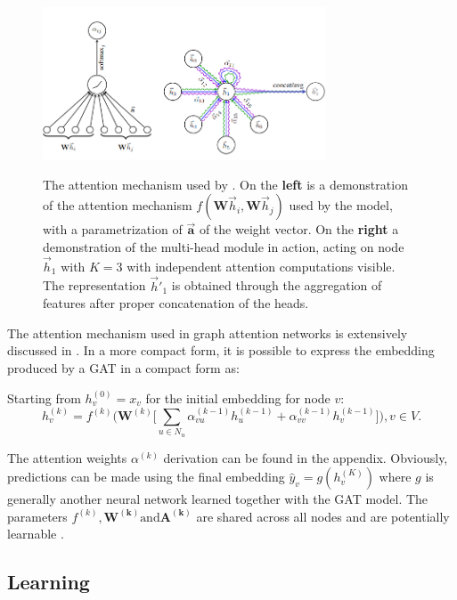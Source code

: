 \begin{figure}[H]
  \centering
  \includegraphics[width=0.75\textwidth]{Figures/chap_gnn/multiheadgat.png}
  \label{fig:multiheadGAN}
  \caption[Multi-head attention mechanism for representation
extraction]{The attention mechanism used by
\citet{velickovic2017graph}. On the \textbf{left} is a demonstration
of the attention mechanism $f(\bm{W}\vec{h}_i, \bm{W}\vec{h}_j) $ used
by the model, with a parametrization of $\bm{\vec{a}}$ of the weight
vector. On the \textbf{right} a demonstration of the multi-head module
in action, acting on node $\vec{h}_1$ with $K=3$ with independent
attention computations visible. The representation $\vec{h}'_1$ is
obtained through the aggregation of features after proper
concatenation of the heads. }
\end{figure}

The attention mechanism used in graph attention networks is extensively
discussed in . In a more compact form, it is possible
to express the embedding produced by a GAT in a compact form as:

Starting from $h_v^{(0)} = x_v$ for the initial embedding for node $v$:
\begin{equation}
h_v^{(k)} = f^{(k)} \Big( \bm{W}^{(k)}\Big[ \sum_{u\in
N_u}\alpha^{(k-1)}_{vu}h^{(k-1)}_u +
\alpha_{vv}^{(k-1)}h_v^{(k-1)}\Big] \Big), v \in V.
\label{eq:gat_compact}
\end{equation}

The attention weights $\alpha^{(k)}$ derivation can be found in the
appendix. Obviously, predictions can be made using the final embedding
$\hat{y}_v = g(h_v^{(K)})$ where $g$ is generally another neural network
learned together with the GAT model. The parameters $f^{(k)}, \bm{W^{(k)}} \text{and}
\bm{A^{(k)}}$ are shared across all nodes and are potentially learnable \cite{daigavane2021understanding}.

\subsection{Learning}

